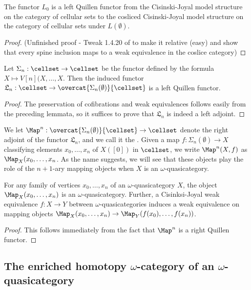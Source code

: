 \begin{prop}The functor \(L_0\) is a left Quillen functor from the Cisinski-Joyal model structure on the category of cellular sets to the cosliced Cisinski-Joyal model structure on the category of cellular sets under \(L(\emptyset)\).   
\end{prop}
\begin{proof}
(Unfinished proof - Tweak 1.4.20 of \cite{cisinski-book} to make it relative (easy) and show that every spine inclusion maps to a weak equivalence in the coslice category) 
\end{proof}

\begin{prop} Let \(\Sigma_n:\cellset\to\cellset\) be the functor defined by the formula \(X\mapsto V[n](X,\dots,X\).  Then the induced functor \(\mathfrak{L}_n:\cellset \to \overcat{\Sigma_n(\emptyset)}{\cellset}\) is a left Quillen functor.  
\end{prop}
\begin{proof} The preservation of cofibrations and weak equivalences follows easily from the preceding lemmata, so it suffices to prove that \(\mathfrak{L}_n\) is indeed a left adjoint.  
\end{proof}

\begin{defn} We let \(\Map^n:\overcat{\Sigma_{n}(\emptyset)}{\cellset}\to \cellset\) denote the right adjoint of the functor \(\mathfrak{L}_n\), and we call it the .  Given a map \(f:\Sigma_n(\emptyset)\to X\) classifying elements \(x_0,\dots,x_n\) of \(X([0])\) in \(\cellset\), we write \(\Map^n(X,f)\) as \(\Map_X(x_0,\dots,x_n\).  As the name suggests, we will see that these objects play the role of the \(n+1\)-ary mapping objects when \(X\) is an \(\omega\)-quasicategory.  
\end{defn}
\begin{cor} For any family of vertices \(x_0,\dots,x_n\) of an \(\omega\)-quasicategory \(X\), the object \(\Map_X(x_0,\dots,x_n)\) is an \(\omega\)-quasicategory.  Further, a Cisinksi-Joyal weak equivalence \(f:X\to Y\) between \(\omega\)-quasicategories induces a weak equivalence on mapping objects \(\Map_X(x_0,\dots,x_n)\to\Map_Y(f(x_0),\dots,f(x_n))\).  
\end{cor}
\begin{proof} This follows immediately from the fact that \(\Map^n\) is a right Quillen functor.  
\end{proof}

\subsection{The enriched homotopy $\omega$-category of an $\omega$-quasicategory}

